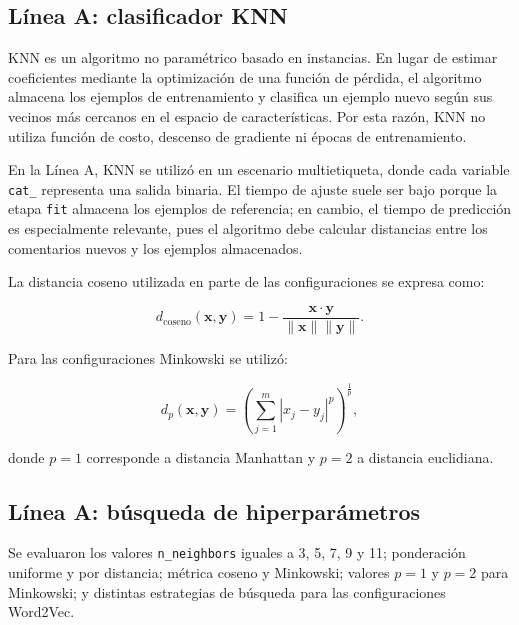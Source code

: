 \documentclass[12pt,a4paper]{article}
\newcommand{\code}[1]{\nolinkurl{#1}}
\begin{document}
\subsection{Línea A: clasificador KNN}

KNN es un algoritmo no paramétrico basado en instancias. En lugar de estimar coeficientes mediante la optimización de una función de pérdida, el algoritmo almacena los ejemplos de entrenamiento y clasifica un ejemplo nuevo según sus vecinos más cercanos en el espacio de características. Por esta razón, KNN no utiliza función de costo, descenso de gradiente ni épocas de entrenamiento.

En la Línea A, KNN se utilizó en un escenario multietiqueta, donde cada variable \code{cat\_} representa una salida binaria. El tiempo de ajuste suele ser bajo porque la etapa \code{fit} almacena los ejemplos de referencia; en cambio, el tiempo de predicción es especialmente relevante, pues el algoritmo debe calcular distancias entre los comentarios nuevos y los ejemplos almacenados.

La distancia coseno utilizada en parte de las configuraciones se expresa como:

\begin{equation}
 d_{\mathrm{coseno}}(\mathbf{x},\mathbf{y}) =
 1 - \frac{\mathbf{x}\cdot\mathbf{y}}
 {\|\mathbf{x}\|\|\mathbf{y}\|}.
\end{equation}

Para las configuraciones Minkowski se utilizó:

\begin{equation}
 d_p(\mathbf{x},\mathbf{y}) =
 \left( \sum_{j=1}^{m}|x_j-y_j|^p \right)^{\frac{1}{p}},
\end{equation}

donde $p=1$ corresponde a distancia Manhattan y $p=2$ a distancia euclidiana.

\subsection{Línea A: búsqueda de hiperparámetros}

Se evaluaron los valores \code{n\_neighbors} iguales a 3, 5, 7, 9 y 11; ponderación uniforme y por distancia; métrica coseno y Minkowski; valores $p=1$ y $p=2$ para Minkowski; y distintas estrategias de búsqueda para las configuraciones Word2Vec.
\end{document}

